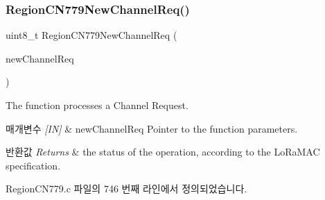 \subsubsection{\texorpdfstring{Region\+C\+N779\+New\+Channel\+Req()}{RegionCN779NewChannelReq()}}
{\footnotesize\ttfamily uint8\+\_\+t Region\+C\+N779\+New\+Channel\+Req (\begin{DoxyParamCaption}\item[{\mbox{\hyperlink{group___r_e_g_i_o_n_gae2abcdb6dbb843c9faf5fd3009eca9d6}{New\+Channel\+Req\+Params\+\_\+t}} $\ast$}]{new\+Channel\+Req }\end{DoxyParamCaption})}



The function processes a Channel Request. 


\begin{DoxyParams}{매개변수}
{\em \mbox{[}\+I\+N\mbox{]}} & new\+Channel\+Req Pointer to the function parameters.\\
\hline
\end{DoxyParams}

\begin{DoxyRetVals}{반환값}
{\em Returns} & the status of the operation, according to the Lo\+Ra\+M\+AC specification. \\
\hline
\end{DoxyRetVals}


Region\+C\+N779.\+c 파일의 746 번째 라인에서 정의되었습니다.


